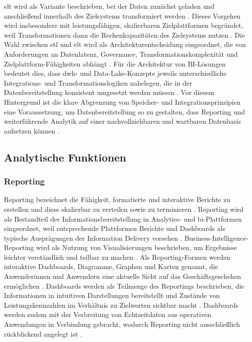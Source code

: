 \gls{elt} wird als Variante beschrieben, bei der Daten zunächst geladen und anschließend innerhalb des Zielsystems transformiert werden \cite{DatabricksETLvsELT}. 
Dieses Vorgehen wird insbesondere mit leistungsfähigen, skalierbaren Zielplattformen begründet, weil Transformationen dann die Rechenkapazitäten des Zielsystems nutzen \cite{DatabricksETLvsELT}. Die Wahl zwischen \gls{etl} und \gls{elt} wird als Architekturentscheidung eingeordnet, die von Anforderungen an Datenlatenz, Governance, Transformationskomplexität und Zielplattform-Fähigkeiten abhängt \cite{BaarsKemper2021}. Für die Architektur von BI-Lösungen bedeutet dies, dass \gls{dwh}- und Data-Lake-Konzepte jeweils unterschiedliche Integrations- und Transformationslogiken nahelegen, die in der Datenbereitstellung konsistent umgesetzt werden müssen \cite{MSDataLakeGuide}. Vor diesem Hintergrund ist die klare Abgrenzung von Speicher- und Integrationsprinzipien eine Voraussetzung, um Datenbereitstellung so zu gestalten, dass Reporting und weiterführende Analytik auf einer nachvollziehbaren und wartbaren Datenbasis aufsetzen können \cite{BaarsKemper2021}. 


\subsection{Analytische Funktionen}

\subsubsection{Reporting}
Reporting bezeichnet die Fähigkeit, formatierte und interaktive Berichte zu erstellen und diese skalierbar zu verteilen sowie zu terminieren \cite{GartnerInformationDelivery}. 
Reporting wird als Bestandteil der Informationsbereitstellung in Analytics- und \gls{bi}-Plattformen eingeordnet, weil entsprechende Plattformen Berichte und Dashboards als typische Ausprägungen der Information Delivery vorsehen \cite{GartnerABIPlatformReq,GartnerInformationDelivery}. Business-Intelligence-Reporting wird als Nutzung von Visualisierungen beschrieben, um Ergebnisse leichter verständlich und teilbar zu machen \cite{MicrosoftWhatIsBI}. Als Reporting-Formen werden interaktive Dashboards, Diagramme, Graphen und Karten genannt, die Anwenderinnen und Anwendern eine aktuelle Sicht auf das Geschäftsgeschehen ermöglichen \cite{MicrosoftWhatIsBI}. Dashboards werden als Teilmenge des Reportings beschrieben, die Informationen in intuitiven Darstellungen bereitstellt und Zustände von Leistungskennzahlen im Verhältnis zu Zielwerten sichtbar macht \cite{GartnerInformationDelivery}. Dashboards werden zudem mit der Verbreitung von Echtzeitdaten aus operativen Anwendungen in Verbindung gebracht, wodurch Reporting nicht ausschließlich rückblickend angelegt ist \cite{GartnerInformationDelivery}. 

